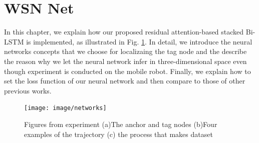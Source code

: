 \documentclass{ieeeaccess}
\begin{document}







\section{WSN Net}

In this chapter, we explain how our proposed residual attention-based stacked Bi-LSTM is implemented, as illustrated in Fig. \ref{fig:our_network}. 
In detail, we introduce the neural networks concepts that we choose for localizaing the tag node and the describe the reason why we let the neural network infer in three-dimensional space even though experiment is conducted on the mobile robot. Finally, we explain how to set the loss function of our neural network and then compare to those of other previous works.

\begin{figure}[h]
	\centering
	\texttt{[image: image/networks]}
	\caption{Figures from experiment (a)The anchor and tag nodes (b)Four examples of the trajectory (c) the process that makes dataset}
	\label{fig:our_network}
\end{figure}
\end{document}
